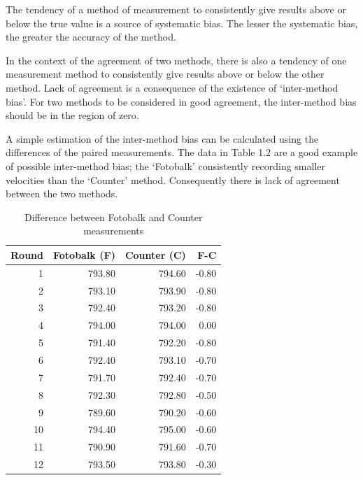 \documentclass[12pt, a4paper]{report}
\theoremstyle{plain}
\theoremstyle{definition}
\theoremstyle{remark}
\begin{document}
	The tendency of a method of measurement to consistently give
	results above or below the true value is a source of systematic
	bias. The lesser the systematic bias, the greater the accuracy of
	the method.
	
	In the context of the agreement of two methods, there is also a
	tendency of one measurement method to consistently give results
	above or below the other method. Lack of agreement is a
	consequence of the existence of `inter-method bias'. For two
	methods to be considered in good agreement, the inter-method bias
	should be in the region of zero.
	
	A simple estimation of the inter-method bias can be calculated
	using the differences of the paired measurements. The data in
	Table 1.2 are a good example of possible inter-method bias; the
	`Fotobalk' consistently recording smaller velocities than the
	`Counter' method. Consequently there is lack of agreement between
	the two methods.
	\newpage
	\begin{table}[h!]
		\begin{center}
			
			\begin{tabular}{rrrr}
				\hline
				Round& Fotobalk (F) & Counter (C) & F-C \\
				\hline
				1 & 793.80 & 794.60 & -0.80 \\
				2 & 793.10 & 793.90 & -0.80 \\
				3 & 792.40 & 793.20 & -0.80 \\
				4 & 794.00 & 794.00 & 0.00 \\
				5 & 791.40 & 792.20 & -0.80 \\
				6 & 792.40 & 793.10 & -0.70 \\
				7 & 791.70 & 792.40 & -0.70 \\
				8 & 792.30 & 792.80 & -0.50 \\
				9 & 789.60 & 790.20 & -0.60 \\
				10 & 794.40 & 795.00 & -0.60 \\
				11 & 790.90 & 791.60 & -0.70 \\
				12 & 793.50 & 793.80 & -0.30 \\
				\hline
			\end{tabular}
			\caption{Difference between Fotobalk and Counter measurements}
		\end{center}
	\end{table}
	
	\bigskip
	
\end{document}
